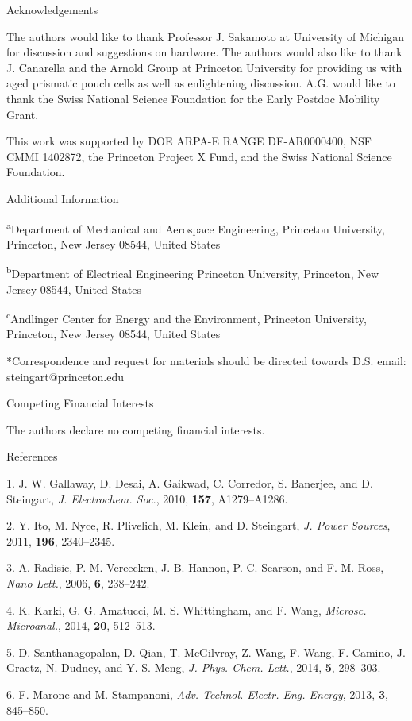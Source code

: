 \documentclass[]{article}
\begin{document}
Acknowledgements

{ }The authors would like to thank Professor J. Sakamoto at University
of Michigan for discussion and suggestions on hardware. The authors
would also like to thank J. Canarella and the Arnold Group at Princeton
University for providing us with aged prismatic pouch cells as well as
enlightening discussion. A.G. would like to thank the Swiss National
Science Foundation for the Early Postdoc Mobility Grant.

{ }This work was supported by DOE ARPA-E RANGE DE-AR0000400, NSF CMMI
1402872, the Princeton Project X Fund, and the Swiss National Science
Foundation.

Additional Information

\textsuperscript{a}Department of Mechanical and Aerospace Engineering,
Princeton University, Princeton, New Jersey 08544, United States

\textsuperscript{b}Department of Electrical Engineering Princeton
University, Princeton, New Jersey 08544, United States

\textsuperscript{c}Andlinger Center for Energy and the Environment,
Princeton University, Princeton, New Jersey 08544, United States

*Correspondence and request for materials should be directed towards
D.S. email: steingart@princeton.edu

Competing Financial Interests

The authors declare no competing financial interests.

References

1.{ }J. W. Gallaway, D. Desai, A. Gaikwad, C. Corredor, S. Banerjee, and
D. Steingart, \emph{J. Electrochem. Soc.}, 2010, \textbf{157},
A1279--A1286.

2.{ }Y. Ito, M. Nyce, R. Plivelich, M. Klein, and D. Steingart, \emph{J.
Power Sources}, 2011, \textbf{196}, 2340--2345.

3.{ }A. Radisic, P. M. Vereecken, J. B. Hannon, P. C. Searson, and F. M.
Ross, \emph{Nano Lett.}, 2006, \textbf{6}, 238--242.

4.{ }K. Karki, G. G. Amatucci, M. S. Whittingham, and F. Wang,
\emph{Microsc. Microanal.}, 2014, \textbf{20}, 512--513.

5.{ }D. Santhanagopalan, D. Qian, T. McGilvray, Z. Wang, F. Wang, F.
Camino, J. Graetz, N. Dudney, and Y. S. Meng, \emph{J. Phys. Chem.
Lett.}, 2014, \textbf{5}, 298--303.

6.{ }F. Marone and M. Stampanoni, \emph{Adv. Technol. Electr. Eng.
Energy}, 2013, \textbf{3}, 845--850.
\end{document}
